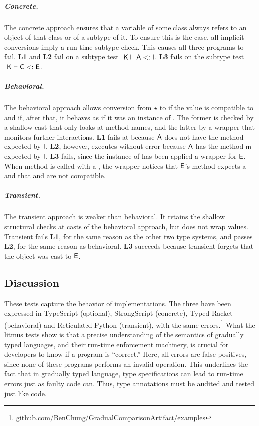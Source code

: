 \documentclass[a4paper,UKenglish]{lipics-v2018}
\newcommand{\EM}[1]{\ensuremath{#1}\xspace}
\newcommand{\xt}[1]{{\sf{#1}}}
\newcommand{\EMxt}[1]{\EM{\xt{#1}}}
\newcommand{\m}{\EMxt m}
\newcommand{\K}{\EMxt K}
\newcommand{\A}{\EMxt {A}}
\newcommand{\I}{\EMxt {I}}
\newcommand{\E}{\EMxt {E}}
\newcommand{\any}{\EM{\star}}
\newcommand{\Sub}{\EM{<:}}
\newcommand{\StrSub}[4]{\EM{#1~#2\vdash #3\Sub #4}}
\newcounter{lem}
\begin{document}
\subparagraph*{Concrete.} The concrete approach ensures that a
variable of some class \C always refers to an object of that class or of a
subtype of it. To ensure this is the case, all implicit conversions imply a
run-time subtype check. This causes all three programs to fail. {\bf L1}
and {\bf L2} fail on a subtype test \StrSub{}\K\A\I. {\bf L3} fails on the
subtype test \StrSub{}\K\C\E.

\subparagraph*{Behavioral.} The behavioral approach allows
conversion from \any to \C if the value is compatible to \C and if,
after that, it behaves as if it was an instance of \C. The former is
checked by a shallow cast that only looks at method names, and the
latter by a wrapper that monitors further interactions. {\bf L1} fails at
because \A does not have the method \xt n expected by \I. {\bf L2}, however,
executes without error because \A has the method \m expected by \I. {\bf L3} fails, since the instance of \C has been applied
a wrapper for \E. When method \a is called with a \C, the wrapper notices
that \E's method \a expects a \D and that \C and \D are not compatible.

\subparagraph*{Transient.} The transient approach is weaker
than behavioral. It retains the shallow structural checks at casts of the
behavioral approach, but does not wrap values. Transient fails {\bf L1}, for
the same reason as the other two type systems, and passes {\bf L2}, for the
same reason as behavioral. {\bf L3} succeeds because transient forgets that
the \C object was cast to \E.

\subsection{Discussion}

These tests capture the behavior of implementations. The three have been
expressed in TypeScript (optional), StrongScript (concrete), Typed Racket
(behavioral) and Reticulated Python (transient), with the same
errors.\footnote{\url{github.com/BenChung/GradualComparisonArtifact/examples}}
What the litmus tests show is that a precise understanding of the semantics
of gradually typed languages, and their run-time enforcement machinery, is
crucial for developers to know if a program is ``correct.'' Here, all
errors are false positives, since none of these programs performs an invalid
operation. This underlines the fact that in gradually typed language, type
specifications can lead to run-time errors just as faulty code can. Thus,
type annotations must be audited and tested just like code.
\end{document}
